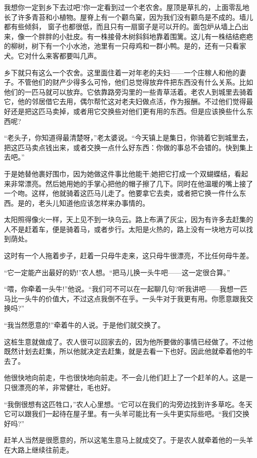 \documentclass[10pt, a4paper]{ctexart} %
\begin{document}
我想你一定到乡下去过吧?你一定看到过一个老农舍。屋顶是草扎的，上面零乱地长了许多青苔和小植物。屋脊上有一个颧鸟窠，因为我们没有颧鸟是不成的。墙儿都有些倾斜， 窗子也都很低，而且只有一扇窗子是可以开的。面包炉从墙上凸出来，像一个胖胖的小肚皮。有一株接骨木树斜斜地靠着围篱。这儿有一株结结疤疤的柳树，树下有一个小水池，池里有一只母鸡和一群小鸭。是的，还有一只看家犬。它对什么来客都要叫几声。


乡下就只有这么一个农舍。这里面住着一对年老的夫妇——一个庄稼人和他的妻子。不管他们的财产少得多么可怜，他们总觉得放弃件把东西没有什么关系。比如他们的一匹马就可以放弃。它依靠路旁沟里的一些青草活着。老农人到城里去骑着它，他的邻居借它去用，偶尔帮忙这对老夫妇做点活，作为报酬。不过他们觉得最好还是把这匹马卖掉，或者用它交换些对他们更有用的东西。但是应该换些什么东西呢?


“老头子，你知道得最清楚呀，”老太婆说。“今天镇上是集日，你骑着它到城里去，把这匹马卖点钱出来，或者交换一点什么好东西：你做的事总不会错的。快到集上去吧。”

于是她替他裹好围巾，因为她做这件事比他能干;她把它打成一个双蝴蝶结，看起来非常漂亮。然后她用她的手掌心把他的帽子擦了几下。同时在他温暖的嘴上接了一个吻。这样，他就骑着这匹马儿走了。他要拿它去卖，或者把它换一件什么东西。是的，老头儿知道他应该怎样来办事情的。

太阳照得像火一样，天上见不到一块乌云。路上布满了灰尘，因为有许多去赶集的人不是赶着车，便是骑着马，或者步行。太阳是火热的，路上没有一块地方可以找到荫处。

这时有一个人拖着步子，赶着一只母牛走来，这只母牛很漂亮，不比任何母牛差。

“它一定能产出最好的奶!”农人想。“把马儿换一头牛吧——这一定很合算。”

“喂，你牵着一头牛!”他说。“我们可不可以在一起聊几句?听我讲吧——我想一匹马比一头牛的价值大，不过这点我倒不在乎。一头牛对于我更有用。你愿意跟我交换吗?”

“我当然愿意的!”牵着牛的人说。于是他们就交换了。

这桩生意就做成了。农人很可以回家去的，因为他所要做的事情已经做了。不过他既然计划去赶集，所以他就决定去赶集，就是去看一下也好。因此他就牵着他的牛去了。

他很快地向前走，牛也很快地向前走。不一会儿他们赶上了一个赶羊的人。这是一只很漂亮的羊，非常健壮，毛也好。

“我倒很想有这匹牲口，”农人心里想。“它可以在我们的沟旁边找到许多草吃。冬天它可以跟我们一起待在屋子里。有一头羊可能比有一头牛更实际些吧。“我们交换好吗?”

赶羊人当然是很愿意的，所以这笔生意马上就成交了。于是农人就牵着他的一头羊在大路上继续往前走。
\end{document}
